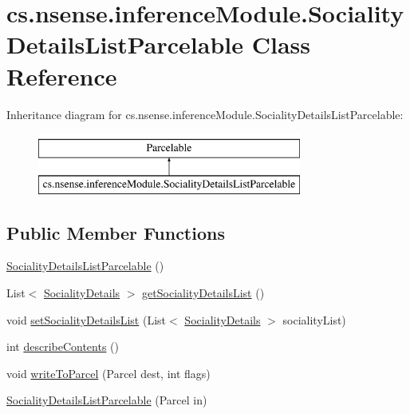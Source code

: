 \hypertarget{classcs_1_1nsense_1_1inference_module_1_1_sociality_details_list_parcelable}{\section{cs.\-nsense.\-inference\-Module.\-Sociality\-Details\-List\-Parcelable Class Reference}
\label{classcs_1_1nsense_1_1inference_module_1_1_sociality_details_list_parcelable}
}
Inheritance diagram for cs.\-nsense.\-inference\-Module.\-Sociality\-Details\-List\-Parcelable\-:\begin{figure}[H]
\begin{center}
\leavevmode
\includegraphics[height=2.000000cm]{classcs_1_1nsense_1_1inference_module_1_1_sociality_details_list_parcelable}
\end{center}
\end{figure}
\subsection*{Public Member Functions}
\begin{DoxyCompactItemize}
\item 
\hyperlink{classcs_1_1nsense_1_1inference_module_1_1_sociality_details_list_parcelable_add706a34a4201215b8665f2b768d8438}{Sociality\-Details\-List\-Parcelable} ()
\item 
List$<$ \hyperlink{classcs_1_1nsense_1_1inference_module_1_1_sociality_details}{Sociality\-Details} $>$ \hyperlink{classcs_1_1nsense_1_1inference_module_1_1_sociality_details_list_parcelable_aa36fc3bdc7206674097688fed1bf999a}{get\-Sociality\-Details\-List} ()
\item 
void \hyperlink{classcs_1_1nsense_1_1inference_module_1_1_sociality_details_list_parcelable_ae32ebe2769d81aa0b6a3da213e94f864}{set\-Sociality\-Details\-List} (List$<$ \hyperlink{classcs_1_1nsense_1_1inference_module_1_1_sociality_details}{Sociality\-Details} $>$ sociality\-List)
\item 
int \hyperlink{classcs_1_1nsense_1_1inference_module_1_1_sociality_details_list_parcelable_a9a07e4ac7ceef1302cfd6e0546cbba91}{describe\-Contents} ()
\item 
void \hyperlink{classcs_1_1nsense_1_1inference_module_1_1_sociality_details_list_parcelable_a8f51fdca192d6fa5879e752f9e603424}{write\-To\-Parcel} (Parcel dest, int flags)
\item 
\hyperlink{classcs_1_1nsense_1_1inference_module_1_1_sociality_details_list_parcelable_aff386958bb25e256b5d24e9ac14637e0}{Sociality\-Details\-List\-Parcelable} (Parcel in)
\end{DoxyCompactItemize}
